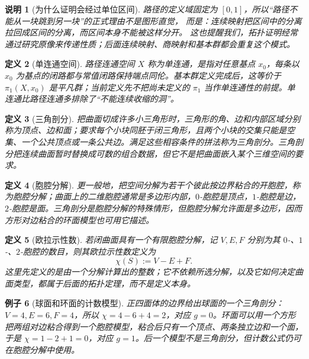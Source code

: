 \documentclass[UTF8,fontset=none,a4paper,11pt]{ctexart}
\theoremstyle{foundation-definition}
\newtheorem{definition}{定义}[section]
\theoremstyle{foundation-theorem}
\theoremstyle{foundation-proposition}
\theoremstyle{foundation-example}
\newtheorem{example}[definition]{例子}
\theoremstyle{foundation-remark}
\newtheorem{remark}[definition]{说明}
\theoremstyle{foundation-theorem}
\begin{document}
\begin{remark}[为什么证明会经过单位区间]
路径的定义域固定为 \([0,1]\)，所以“路径不能从一块跳到另一块”的正式理由不是图形直觉，
而是：连续映射把区间中的分离拉回成区间的分离，而区间本身不能被这样分开。
这也提醒我们，拓扑证明经常通过研究原像来传递性质；后面连续映射、商映射和基本群都会重复这个模式。
\end{remark}

\begin{definition}[单连通空间]\label{def:simply-connected}
路径连通空间 \(X\) 称为单连通，是指对任意基点 \(x_0\)，每条以 \(x_0\) 为基点的闭路都与常值闭路保持端点同伦。基本群定义完成后，这等价于 \(\pi_1(X,x_0)\) 是平凡群；当前定义先不把尚未定义的 \(\pi_1\) 当作单连通性的前提。单连通比路径连通多排除了“不能连续收缩的洞”。
\end{definition}

\begin{definition}[三角剖分]\label{def:triangulation}
把曲面切成许多小三角形时，三角形的角、边和内部区域分别称为顶点、边和面；要求每个小块同胚于闭三角形，且两个小块的交集只能是空集、一个公共顶点或一条公共边。满足这些相容条件的拼法称为三角剖分。三角剖分把连续曲面暂时替换成可数的组合数据，但它不是把曲面嵌入某个三维空间的要求。
\end{definition}

\begin{definition}[胞腔分解]\label{def:cell-decomposition}
更一般地，把空间分解为若干个彼此按边界粘合的开胞腔，称为胞腔分解；曲面上的二维胞腔通常是多边形内部，\(0\)-胞腔是顶点，\(1\)-胞腔是边，\(2\)-胞腔是面。三角剖分是胞腔分解的特殊情形，但胞腔分解允许面是多边形，因而方形对边粘合的环面模型也可用它描述。
\end{definition}

\begin{definition}[欧拉示性数]\label{def:euler-characteristic}
若闭曲面具有一个有限胞腔分解，记 \(V,E,F\) 分别为其 \(0\)-、\(1\)-、\(2\)-胞腔的数目，则其欧拉示性数定义为
\[
\chi(S):=V-E+F.
\]
这里先定义的是由一个分解计算出的整数；它不依赖所选分解，以及它如何决定曲面类型，都属于后面的拓扑定理，而不是定义本身。
\end{definition}

\begin{example}[球面和环面的计数模型]
正四面体的边界给出球面的一个三角剖分：\(V=4,E=6,F=4\)，所以 \(\chi=4-6+4=2\)，对应 \(g=0\)。环面可以用一个方形把两组对边粘合得到一个胞腔模型，粘合后只有一个顶点、两条独立边和一个面，于是 \(\chi=1-2+1=0\)，对应 \(g=1\)。后一个模型不是三角剖分，但计数公式仍可在胞腔分解中使用。
\end{example}
\end{document}
